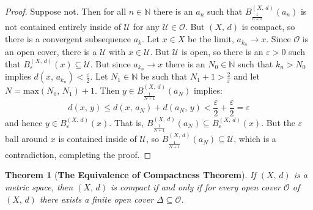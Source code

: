 \documentclass{article}
\theoremstyle{plain}
\newtheorem{theorem}{Theorem}[section]
\theoremstyle{normal}
\begin{document}
        \begin{proof}
            Suppose not. Then for all $n\in\mathbb{N}$ there is an
            $a_{n}$ such that $B_{\frac{1}{n+1}}^{(X,\,d)}(a_{n})$ is not
            contained entirely inside of $\mathcal{U}$ for any
            $\mathcal{U}\in\mathcal{O}$. But $(X,\,d)$ is compact, so there
            is a convergent subsequence $a_{k}$. Let $x\in{X}$ be the limit,
            $a_{k_{n}}\rightarrow{x}$. Since $\mathcal{O}$ is an open cover,
            there is a $\mathcal{U}$ with $x\in\mathcal{U}$. But $\mathcal{U}$
            is open, so there is an $\varepsilon>0$ such that
            $B_{\varepsilon}^{(X,\,d)}(x)\subseteq\mathcal{U}$. But since
            $a_{k_{n}}\rightarrow{x}$ there is an $N_{0}\in\mathbb{N}$ such that
            $k_{n}>N_{0}$ implies $d(x,\,a_{k_{n}})<\frac{\varepsilon}{2}$. Let
            $N_{1}\in\mathbb{N}$ be such that $N_{1}+1>\frac{2}\varepsilon$ and
            let $N=\textrm{max}(N_{0},\,N_{1})+1$. Then
            $y\in{B}_{\frac{1}{N+1}}^{(X,\,d)}(a_{N})$ implies:
            \begin{equation}
                d(x,\,y)\leq{d}(x,\,a_{N})+d(a_{N},\,y)
                    <\frac{\varepsilon}{2}+\frac{\varepsilon}{2}=\varepsilon
            \end{equation}
            and hence $y\in{B}_{\varepsilon}^{(X,\,d)}(x)$. That is,
            $B_{\frac{1}{N+1}}^{(X,\,d)}(a_{N})\subseteq{B}_{\varepsilon}^{(X,\,d)}(x)$.
            But the $\varepsilon$ ball around $x$ is contained inside of
            $\mathcal{U}$, so
            $B_{\frac{1}{N+1}}^{(X,\,d)}(a_{N})\subseteq\mathcal{U}$, which
            is a contradiction, completing the proof.
        \end{proof}
        \begin{theorem}[\textbf{The Equivalence of Compactness Theorem}]
            If $(X,\,d)$ is a metric space, then $(X,\,d)$ is compact if and
            only if for every open cover $\mathcal{O}$ of $(X,\,d)$ there exists
            a finite open cover $\Delta\subseteq\mathcal{O}$.
        \end{theorem}
\end{document}
